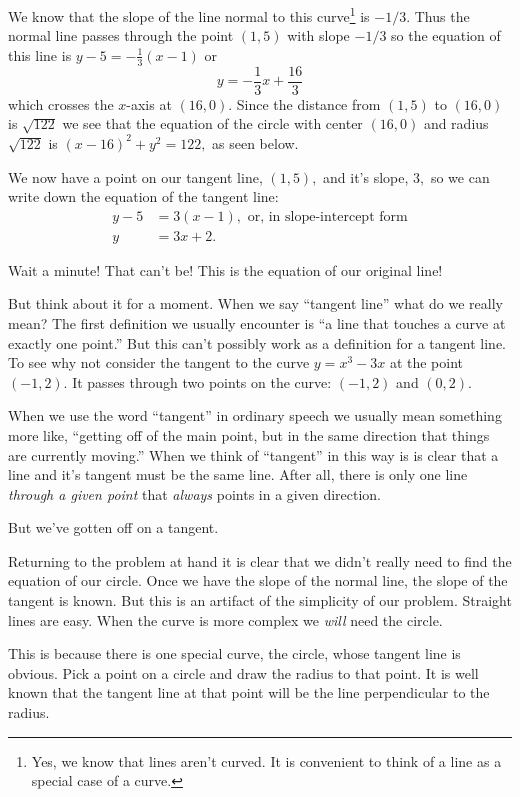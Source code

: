 \InsertGraphic{}

We know that the slope of the line normal to this curve\footnote{Yes,
  we know that lines aren't curved. It is convenient
  to think of a line as a special case of a curve.} is $-1/3.$ Thus
the normal line passes through the point $(1,5)$ with slope $-1/3$ so
the equation of this line is 
$
y-5=-\frac13(x-1)
$
or 
$$
y=-\frac13 x+\frac{16}{3}
$$
which crosses the $x$-axis at $(16,0).$ Since the distance from
$(1,5)$ to $(16,0)$ is $\sqrt{122}$ we see that the equation of the
circle with center $(16, 0)$ and radius $\sqrt{122}$ is $(x-16)^2 +y^2
= 122,$ as seen below.

\InsertGraphic{}

We now have a point on our tangent line, $(1,5),$  and it's slope,
$3,$  so we can write down the equation of the tangent line:
\begin{align*}
  y-5&=3(x-1), \text{ or, in slope-intercept form}\\
  y&=3x+2.
\end{align*}

Wait a minute! That can't be! This is the equation of our original
line!

But think about it for a moment. When we say ``tangent line'' what do
we really mean? The first definition we usually encounter is ``a line
that touches a curve at exactly one point.'' But this can't possibly
work as a definition for a tangent line. To see why not consider the
tangent to the curve $y=x^3-3x$ at the point $(-1,2).$ It passes
through two points on the curve: $(-1,2)$ and $(0,2).$

When we use the word ``tangent'' in ordinary speech we usually mean
something more like, ``getting off of the main point, but in the same
direction that things are currently moving.'' When we think
of ``tangent'' in this way is is clear that a line and it's tangent
must be the same line. After all, there is only one line \emph{through a
given point} that \emph{always} points in a given direction.

But we've gotten off on a tangent.

Returning to the problem at hand it is clear that we didn't really
need to find the equation of our circle. Once we have the slope of the normal line,
the slope of the tangent is known. But this is an artifact of the
simplicity of our problem. Straight lines are easy. When the curve is
more complex we \emph{will} need the circle.

This is because there is one special curve, the circle, whose tangent line is
obvious. Pick a point on a circle and draw the radius to that
point. It is well known that the tangent line at that point will be
the line perpendicular to the radius.



